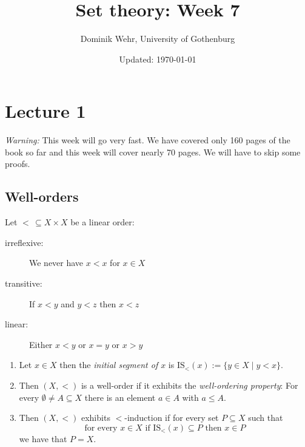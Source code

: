 \documentclass{whrartcl}
\title{Set theory: Week 7}
\author{Dominik Wehr, University of Gothenburg}
\date{Updated: \today}
\newcommand{\IS}{\text{IS}}
\begin{document}
\maketitle

\section{Lecture 1}

\emph{Warning:} This week will go very fast. We have covered only 160 pages
of the book so far and this week will cover nearly 70 pages. We will
have to skip some proofs.

\subsection{Well-orders}

\begin{definition}
  Let $<\, \subseteq X \times X$ be a linear order:
  \begin{description}
  \item[irreflexive:] We never have $x < x$ for $x \in X$
  \item[transitive:] If $x < y$ and $y < z$ then $x < z$
  \item[linear:] Either $x < y$ or $x = y$ or $x > y$
  \end{description}

  \begin{enumerate}
  \item Let $x \in X$ then the \emph{initial segment of $x$} is $\IS_<(x) := \{y
    \in X \mid y < x \}$.
  \item Then $(X, <)$ is a well-order if it exhibits the \emph{well-ordering
      property}: For every $\emptyset \neq A \subseteq X$ there is an element $a
    \in A$ with $a \leq A$.
  \item Then $(X, <)$ exhibits $<$-induction if for every set $P \subseteq X$ such that
    \[
      \text{for every } x \in X \text{ if } \IS_<(x) \subseteq P \text{ then } x
      \in P
    \]
    we have that $P = X$.
  \end{enumerate}
\end{definition}
\end{document}
